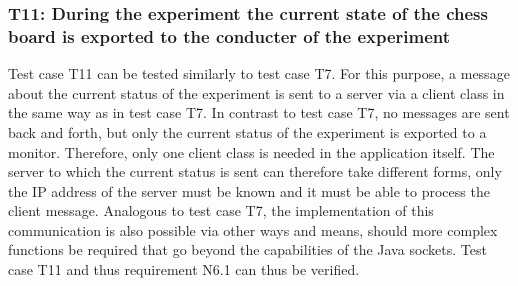 
\newpage

\subsubsection*{T11: During the experiment the current state of the chess board is exported to the conducter of the experiment}

Test case T11 can be tested similarly to test case T7. For this purpose, a message about the current status of the experiment is sent to a server via a client class in the same way as in test case T7. In contrast to test case T7, no messages are sent back and forth, but only the current status of the experiment is exported to a monitor. Therefore, only one client class is needed in the application itself. The server to which the current status is sent can therefore take different forms, only the IP address of the server must be known and it must be able to process the client message. Analogous to test case T7, the implementation of this communication is also possible via other ways and means, should more complex functions be required that go beyond the capabilities of the Java sockets. Test case T11 and thus requirement N6.1 can thus be verified.


